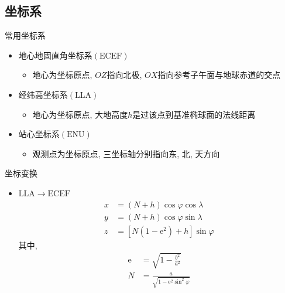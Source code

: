 \subsection{坐标系}
\begin{frame}{常用坐标系}
    \begin{itemize}
        \item 地心地固直角坐标系$\left( \mathrm{ECEF} \right)$
        \begin{itemize}
            \item[] 地心为坐标原点, $OZ$指向北极, $OX$指向参考子午面与地球赤道的交点
        \end{itemize}
        \item 经纬高坐标系$\left( \mathrm{ LLA } \right)$
        \begin{itemize}
            \item[] 地心为坐标原点, 大地高度$h$是过该点到基准椭球面的法线距离
        \end{itemize}
        \item 站心坐标系$\left( \mathrm{ ENU } \right)$
        \begin{itemize}
            \item[] 观测点为坐标原点, 三坐标轴分别指向东, 北, 天方向
        \end{itemize}
    \end{itemize}
\end{frame}

\begin{frame}{坐标变换}
    \begin{itemize}
        \item $\mathrm{LLA} \rightarrow \mathrm{ECEF}$
        \begin{align*}
            x &= \left( N + h \right) \cos \varphi \cos \lambda \\
            y &= \left( N + h \right) \cos \varphi \sin \lambda \\
            z &= \left[ N \left( 1 - \mathrm e ^ 2 \right) + h \right] \sin \varphi
        \end{align*}
        其中,
        \begin{align*}
            \mathrm e &= \sqrt{ 1 - \frac{ b ^ 2 }{ a ^ 2 } } \\
            N &= \frac{ a }{ \sqrt{ 1 - \mathrm e ^ 2 \sin ^ 2 \varphi } }
        \end{align*}
    \end{itemize}
\end{frame}

